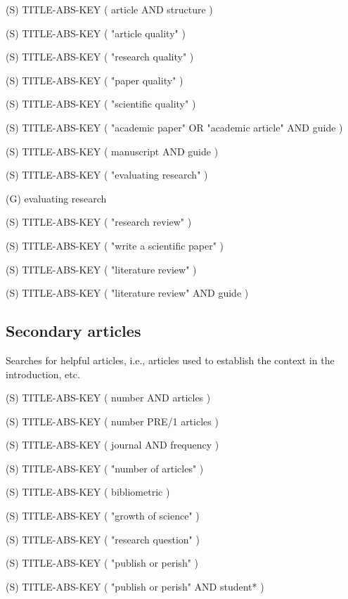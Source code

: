 (S) TITLE-ABS-KEY ( article AND structure )

(S) TITLE-ABS-KEY ( "article quality" )

(S) TITLE-ABS-KEY ( "research quality" )

(S) TITLE-ABS-KEY ( "paper quality" )

(S) TITLE-ABS-KEY ( "scientific quality" )

(S) TITLE-ABS-KEY ( "academic paper"  OR  "academic article"  AND  guide )

(S) TITLE-ABS-KEY ( manuscript  AND  guide )

(S) TITLE-ABS-KEY ( "evaluating research" )

(G) evaluating research

(S) TITLE-ABS-KEY ( "research review" ) 

(S) TITLE-ABS-KEY ( "write a scientific paper" )

(S) TITLE-ABS-KEY ( "literature review" )

(S) TITLE-ABS-KEY ( "literature review" AND guide )

\subsection{Secondary articles}
Searches for helpful articles, i.e., articles used to establish the context in the introduction, etc.

(S) TITLE-ABS-KEY ( number AND articles )

(S) TITLE-ABS-KEY ( number PRE/1 articles )

(S) TITLE-ABS-KEY ( journal AND frequency )

(S) TITLE-ABS-KEY ( "number of articles" )

(S) TITLE-ABS-KEY ( bibliometric )

(S) TITLE-ABS-KEY ( "growth of science" )

(S) TITLE-ABS-KEY ( "research question" )

(S) TITLE-ABS-KEY ( "publish or perish" )

(S) TITLE-ABS-KEY ( "publish or perish" AND student* )